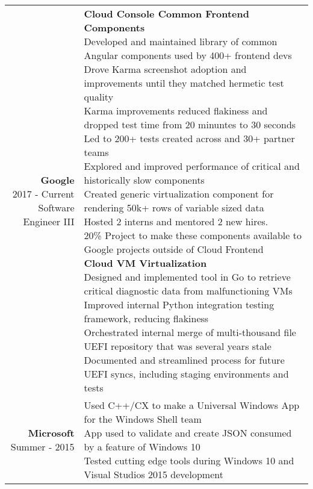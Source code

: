 \documentclass{article}
\makeatletter
\newcommand*\lineBr[2][c]{\begin{tabular}[#1]{@{}r@{}}#2\end{tabular}}
\newcommand*\lineBl[2][c]{\begin{tabular}[#1]{@{}l@{}}#2\end{tabular}}
\makeatother
\begin{document}
\begin{tabularx}{\textwidth}{ r | X }
  \vspace{4mm}
  \lineBr{ {\large {\bf Google }\\[2mm]2017 - Current\\[2mm]Software Engineer III}} &
  \lineBl{
    {\bf Cloud Console Common Frontend Components} \\[2mm]
    Developed and maintained library of common Angular components used by 400+ frontend devs \\[2mm]
    Drove Karma screenshot adoption and improvements until they matched hermetic test quality \\[2mm]
    Karma improvements reduced flakiness and dropped test time from 20 minuntes to 30 seconds \\[2mm]
    Led to 200+ tests created across and 30+ partner teams \\[2mm]
    Explored and improved performance of critical and historically slow components \\[2mm]
    Created generic virtualization component for rendering 50k+ rows of variable sized data \\[2mm]
    Hosted 2 interns and mentored 2 new hires. \\[2mm]
    20\% Project to make these components available to Google projects outside of Cloud Frontend \\[4mm]
    {\bf Cloud VM Virtualization} \\[2mm]
    Designed and implemented tool in Go to retrieve critical diagnostic data from malfunctioning VMs \\[2mm]
    Improved internal Python integration testing framework, reducing flakiness \\[2mm]
    Orchestrated internal merge of multi-thousand file UEFI repository that was several years stale \\[2mm]
    Documented and streamlined process for future UEFI syncs, including staging environments and tests \\[2mm]
  } \\
  \vspace{4mm}
  \lineBr{ {\large {\bf Microsoft }\\[2mm]Summer - 2015}} &
  \lineBl{
    Used C++/CX to make a Universal Windows App for the Windows Shell team \\[2mm] 
    App used to validate and create JSON consumed by a feature of Windows 10 \\[2mm]
    Tested cutting edge tools during Windows 10 and Visual Studios 2015 development 
}
\end{tabularx}
\end{document}
